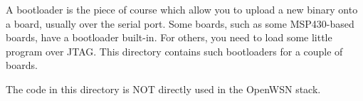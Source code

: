 A bootloader is the piece of course which allow you to upload a new binary onto a board, usually over the serial port. Some boards, such as some M\+S\+P430-\/based boards, have a bootloader built-\/in. For others, you need to load some little program over J\+T\+AG. This directory contains such bootloaders for a couple of boards.

The code in this directory is N\+OT directly used in the Open\+W\+SN stack. 